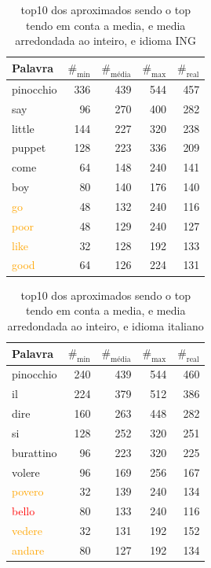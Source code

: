 \documentclass[mirror, portugues]{revdetua}
\begin{document}
\begin{table}[H]
\centering
\caption{top10 dos aproximados sendo o top tendo em conta a media, e media arredondada ao inteiro, e idioma ING}
\label{table:top10_aprox_ingles}
\begin{tabular}{lrrr|r}
\toprule
Palavra & $\text{\#}_{\text{min}}$ & $\text{\#}_{\text{média}}$ & $\text{\#}_{\text{max}}$ & $\text{\#}_{\text{real}}$ \\
\midrule
pinocchio & 336 & 439 & 544 & 457 \\
say & 96 & 270 & 400 & 282 \\
little & 144 & 227 & 320 & 238 \\
puppet & 128 & 223 & 336 & 209 \\
come & 64 & 148 & 240 & 141 \\
boy & 80 & 140 & 176 & 140 \\
\textcolor{orange}{go} & 48 & 132 & 240 & 116 \\
\textcolor{orange}{poor} & 48 & 129 & 240 & 127 \\
\textcolor{orange}{like} & 32 & 128 & 192 & 133 \\
\textcolor{orange}{good} & 64 & 126 & 224 & 131 \\
\bottomrule
\end{tabular}
\end{table}

\begin{table}[H]
\centering
\caption{top10 dos aproximados sendo o top tendo em conta a media, e media arredondada ao inteiro, e idioma italiano}
\label{table:top10_aprox_italiano}
\begin{tabular}{lrrr|r}
\toprule
Palavra & $\text{\#}_{\text{min}}$ & $\text{\#}_{\text{média}}$ & $\text{\#}_{\text{max}}$ & $\text{\#}_{\text{real}}$ \\
\midrule
pinocchio & 240 & 439 & 544 & 460 \\
il & 224 & 379 & 512 & 386 \\
dire & 160 & 263 & 448 & 282 \\
si & 128 & 252 & 320 & 251 \\
burattino & 96 & 223 & 320 & 225 \\
volere & 96 & 169 & 256 & 167 \\
\textcolor{orange}{povero} & 32 & 139 & 240 & 134 \\
\textcolor{red}{bello} & 80 & 133 & 240 & 116 \\
\textcolor{orange}{vedere} & 32 & 131 & 192 & 152 \\
\textcolor{orange}{andare} & 80 & 127 & 192 & 134 \\
\bottomrule
\end{tabular}
\end{table}
\end{document}
